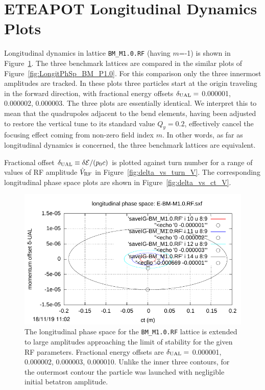 \documentclass[]{article}
\begin{document}
\section{ETEAPOT Longitudinal Dynamics Plots}
Longitudinal dynamics in lattice {\tt BM\_M1.0.RF} (having $m$=-1) is
shown in Figure~\ref{fig:LongitPhSp_BM_M1.0}.
The three
benchmark lattices are compared in the similar plots of
Figure~\ref{fig:LongitPhSp_BM_P1.0}. For this comparison 
only the three innermost amplitudes
are tracked. In these plots three particles start at the origin
traveling in the forward direction, with fractional
energy offsets $\delta_{\rm UAL}=$ 0.000001, 0.000002, 0.000003.
The three plots are essentially identical. We interpret this
to mean that the quadrupoles adjacent to the bend elements,
having been adjusted to restore the vertical tune to its
standard value $Q_y=0.2$, effectively cancel the
focusing effect coming from non-zero field index $m$.
In other words, as far as longitudinal dynamics is concerned,
the three benchmark lattices are equivalent.

Fractional offset 
$\delta_{\rm UAL}\equiv\delta{\mathcal{E}}/(p_0c)$ is
plotted against turn number for a range of 
values of RF amplitude $\hat V_{\rm RF}$ in 
Figure~\ref{fig:delta_vs_turn_V}.  The corresponding longitudinal
phase space plots are shown in Figure~\ref{fig:delta_vs_ct_V}.
%
\begin{figure}[h]
\centering
\includegraphics[scale=1.19]{pdf/BM-III_Figure3.pdf}
\caption{\label{fig:LongitPhSp_BM_M1.0}The longitudinal phase space for 
the {\tt BM\_M1.0.RF} lattice is extended to large amplitudes approaching
the limit of stability for the given RF parameters.
Fractional energy offsets are 
$\delta_{\rm UAL}=$ 0.000001, 0.000002, 0.000003, 0.000010. Unlike
the inner three contours, for the outermost contour the particle was 
launched with negligible initial betatron amplitude. 
}
\end{figure}
%
\end{document}
